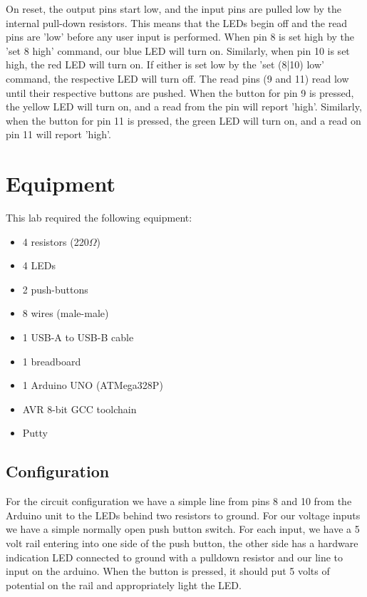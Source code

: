 \documentclass[letterpaper,11pt]{texMemo} %
\begin{document}
On reset, the output pins start low, and the input pins are pulled low by the internal pull-down resistors. This means that the LEDs begin off and the read pins are 'low' before any user input is performed. When pin 8 is set high by the 'set 8 high' command, our blue LED will turn on. Similarly, when pin 10 is set high, the red LED will turn on. If either is set low by the 'set (8|10) low' command, the respective LED will turn off. The read pins (9 and 11) read low until their respective buttons are pushed. When the button for pin 9 is pressed, the yellow LED will turn on, and a read from the pin will report 'high'. Similarly, when the button for pin 11 is pressed, the green LED will turn on, and a read on pin 11 will report 'high'.


\section*{Equipment}
This lab required the following equipment:
\begin{itemize}
\item 4 resistors (220$\Omega$)
\item 4 LEDs
\item 2 push-buttons
\item 8 wires (male-male)
\item 1 USB-A to USB-B cable
\item 1 breadboard
\item 1 Arduino UNO (ATMega328P)
\item AVR 8-bit GCC toolchain
\item Putty
\end{itemize}

\subsection*{Configuration}
For the circuit configuration we have a simple line from pins 8 and 10 from the Arduino unit to the LEDs behind two
resistors to ground. For our voltage inputs we have a simple normally open push button switch. For each input, we have
a 5 volt rail entering into one side of the push button, the other side has a hardware indication LED connected to
ground with a pulldown resistor and our line to input on the arduino. When the button is pressed, it should put 5
volts of potential on the rail and appropriately light the LED.
\end{document}
